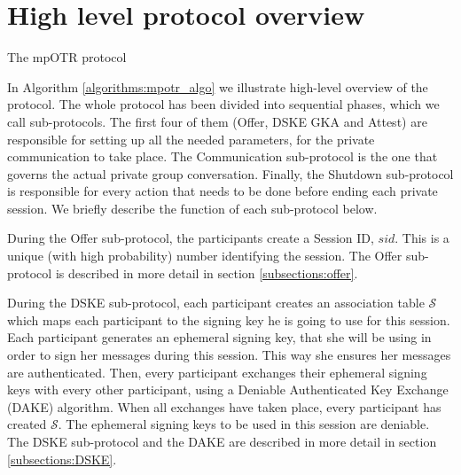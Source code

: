 \section{High level protocol overview}
\begin{algorithm}[H]
  \label{algorithms:mpotr_algo}
  \caption{The mpOTR protocol}
\end{algorithm}

In Algorithm \ref{algorithms:mpotr_algo} we illustrate high-level overview of the protocol. The whole protocol has been divided into sequential phases, which we call sub-protocols. The first four of them (Offer, DSKE GKA and Attest) are responsible for setting up all the needed parameters, for the private communication to take place. The Communication sub-protocol is the one that governs the actual private group conversation. Finally, the Shutdown sub-protocol is responsible for every action that needs to be done before ending each private session. We briefly describe the function of each sub-protocol below.

During the Offer sub-protocol, the participants create a Session ID, $sid$. This is a unique (with high probability) number identifying the session. The Offer sub-protocol is described in more detail in section \ref{subsections:offer}. 

During the DSKE sub-protocol, each participant creates an association table $\mathcal{S}$ which maps each participant to the signing key he is going to use for this session. Each participant generates an ephemeral signing key, that she will be using in order to sign her messages during this session. This way she ensures her messages are authenticated. Then, every participant exchanges their ephemeral signing keys with every other participant, using a Deniable Authenticated Key Exchange (DAKE) algorithm. When all exchanges have taken place, every participant has created $\mathcal{S}$. The ephemeral signing keys to be used in this session are deniable. The DSKE sub-protocol and the DAKE are described in more detail in section \ref{subsections:DSKE}.

